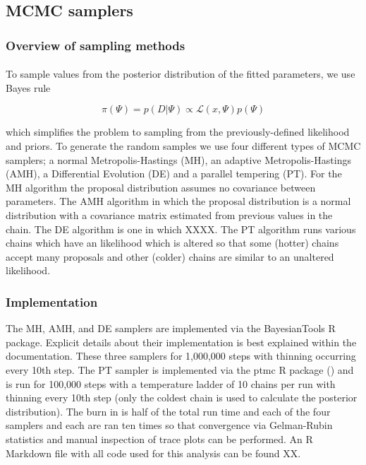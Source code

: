 \documentclass[10pt,twoside]{report} %
\begin{document}
\subsection{MCMC samplers}

\subsubsection{Overview of sampling methods} 
\paragraph{}To sample values from the posterior distribution of the fitted parameters, we use Bayes rule

\begin{equation}
\pi(\Psi) = p(D|\Psi) \propto \mathcal{L}(x, \Psi)p(\Psi)
\end{equation}

which simplifies the problem to sampling from the previously-defined likelihood and priors. To generate the random samples we use four different types of MCMC samplers; a normal Metropolis-Hastings (MH), an adaptive Metropolis-Hastings (AMH), a Differential Evolution (DE) and a parallel tempering (PT). For the MH algorithm the proposal distribution assumes no covariance between parameters. The AMH algorithm in which the proposal distribution is a normal distribution with a covariance matrix estimated from previous values in the chain. The DE algorithm is one in which XXXX. The PT algorithm runs various chains which have an likelihood which is altered so that some (hotter) chains accept many proposals and other (colder) chains are similar to an unaltered likelihood. 


\subsubsection{Implementation} 
The MH, AMH, and DE samplers are implemented via the BayesianTools R package. Explicit details about their implementation is best explained within the documentation. These three samplers for 1,000,000 steps with thinning occurring every 10th step. The PT sampler is implemented via the ptmc R package () and is run for 100,000 steps with a temperature ladder of 10 chains per run with thinning every 10th step (only the coldest chain is used to calculate the posterior distribution). The burn in is half of the total run time and each of the four samplers and each are ran ten times so that convergence via Gelman-Rubin statistics and manual inspection of trace plots can be performed. An R Markdown file with all code used for this analysis can be found XX. 
\end{document}
